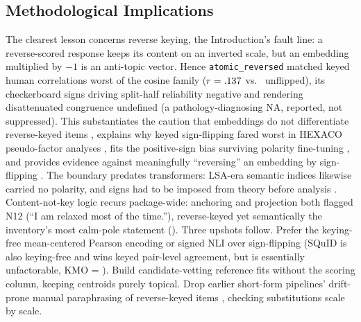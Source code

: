 \subsection{Methodological Implications}

The clearest lesson concerns reverse keying, the Introduction's fault
line: a reverse-scored response keeps its content on an inverted scale, but an
embedding multiplied by $-1$ is an anti-topic vector. Hence
\texttt{atomic\_reversed} matched keyed human correlations worst of the
cosine family ($r = .137$ vs.\ \valAtRKeyed{} unflipped), its checkerboard signs
driving split-half reliability negative and rendering disattenuated
congruence undefined (a pathology-diagnosing NA, reported, not
suppressed). This substantiates the caution that embeddings do not
differentiate reverse-keyed items \citep{suarez-alvarez-etal-2026},
explains why keyed sign-flipping fared worst in HEXACO pseudo-factor
analyses \citep{guenole-etal-2025}, fits the positive-sign bias surviving
polarity fine-tuning \citep{hommel-arslan-2025}, and provides evidence
against meaningfully ``reversing'' an embedding by sign-flipping
\citep{pellert-etal-2026}. The boundary predates transformers: LSA-era
semantic indices likewise carried no polarity, and signs had to be imposed
from theory before analysis \citep{arnulf-etal-2014}. Content-not-key logic recurs package-wide:
anchoring and projection both flagged N12 (``I am relaxed most of the
time.''), reverse-keyed yet semantically the inventory's most calm-pole
statement (\valProjNTwCalm). Three upshots follow. Prefer the keying-free
mean-centered Pearson encoding or signed NLI over sign-flipping (SQuID is
also keying-free and wins keyed pair-level agreement, but is essentially
unfactorable, KMO = \valSqKmo). Build
candidate-vetting reference fits without the scoring column, keeping
centroids purely topical. Drop earlier short-form pipelines'
drift-prone manual paraphrasing of reverse-keyed items
\citep{jung-seo-2025,wang-etal-2026}, checking substitutions scale by
scale.

